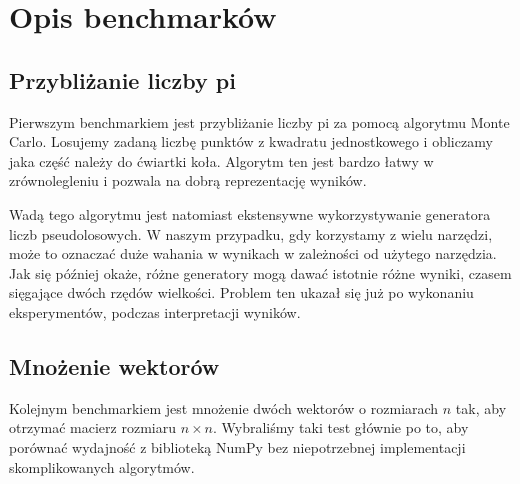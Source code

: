 \section{Opis benchmarków}

\subsection{Przybliżanie liczby pi}

Pierwszym benchmarkiem jest przybliżanie liczby pi za pomocą
algorytmu Monte Carlo.
Losujemy zadaną liczbę punktów z kwadratu jednostkowego
i obliczamy jaka część należy do ćwiartki koła.
Algorytm ten jest bardzo łatwy w zrównolegleniu
i pozwala na dobrą reprezentację wyników.

Wadą tego algorytmu jest natomiast ekstensywne wykorzystywanie
generatora liczb pseudolosowych.
W naszym przypadku, gdy korzystamy z wielu narzędzi, może
to oznaczać duże wahania w wynikach w zależności od użytego narzędzia.
Jak się później okaże, różne generatory mogą dawać istotnie różne wyniki,
czasem sięgające dwóch rzędów wielkości.
Problem ten ukazał się już po wykonaniu eksperymentów,
podczas interpretacji wyników.

\subsection{Mnożenie wektorów}

Kolejnym benchmarkiem jest mnożenie dwóch wektorów o rozmiarach
$n$ tak, aby otrzymać macierz rozmiaru $n\times n$.
Wybraliśmy taki test głównie po to, aby porównać wydajność
z biblioteką NumPy bez niepotrzebnej implementacji skomplikowanych
algorytmów.
